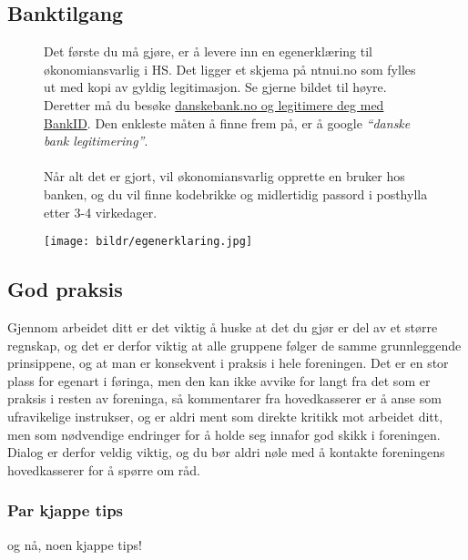 \subsection{Banktilgang}
\begin{figure}[!htb]
\centering
\begin{minipage}{0.4\textwidth}
	Det første du må gjøre, er å levere inn en egenerklæring til økonomiansvarlig i HS. Det ligger et skjema på ntnui.no som fylles ut med kopi av gyldig legitimasjon. Se gjerne bildet til høyre. \\
	Deretter må du besøke \href{https://www.danskebank.no/nb-no/bedrift/smaabedrifter/nettbank/pages/identifisering.aspx}{danskebank.no og legitimere deg med BankID}. Den enkleste måten å finne frem på, er å google \emph{``danske bank legitimering''}. \\ \\
Når alt det er gjort, vil økonomiansvarlig opprette en bruker hos banken, og du vil finne kodebrikke og midlertidig passord i posthylla etter 3-4 virkedager.
\end{minipage}
\begin{minipage}{0.5\textwidth}
	\texttt{[image: bildr/egenerklaring.jpg]}
\end{minipage}
\end{figure}

\subsection{God praksis}
Gjennom arbeidet ditt er det viktig å huske at det du gjør er del av et større regnskap, og det er derfor viktig at alle gruppene følger de samme grunnleggende prinsippene, og at man er konsekvent i praksis i hele foreningen. Det er en stor plass for egenart i føringa, men den kan ikke avvike for langt fra det som er praksis i resten av foreninga, så kommentarer fra hovedkasserer er å anse som ufravikelige instrukser, og er aldri ment som direkte kritikk mot arbeidet ditt, men som nødvendige endringer for å holde seg innafor god skikk i foreningen. Dialog er derfor veldig viktig, og du bør aldri nøle med å kontakte foreningens hovedkasserer for å spørre om råd.

\subsubsection*{Par kjappe tips}
og nå, noen kjappe tips!

